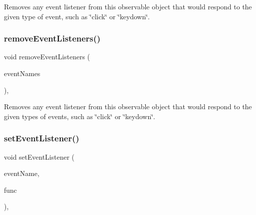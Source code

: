 Removes any event listener from this observable object that would respond to the given type of event, such as \char`\"{}click\char`\"{} or \char`\"{}keydown\char`\"{}. 

\mbox{\label{classsgl_1_1GObservable_af51cc35c29a1bd1908609d432decdbb6}} 
\subsubsection{\texorpdfstring{remove\+Event\+Listeners()}{removeEventListeners()}}
{\footnotesize\ttfamily void remove\+Event\+Listeners (\begin{DoxyParamCaption}\item[{std\+::initializer\+\_\+list$<$ std\+::string $>$}]{event\+Names }\end{DoxyParamCaption})\hspace{0.3cm}{\ttfamily [protected]}, {\ttfamily [virtual]}}



Removes any event listener from this observable object that would respond to the given types of events, such as \char`\"{}click\char`\"{} or \char`\"{}keydown\char`\"{}. 

\mbox{\label{classsgl_1_1GObservable_ad2f6d34961c50f6c1e0659990b79f741}} 
\subsubsection{\texorpdfstring{set\+Event\+Listener()}{setEventListener()}\hspace{0.1cm}{\footnotesize\ttfamily [1/2]}}
{\footnotesize\ttfamily void set\+Event\+Listener (\begin{DoxyParamCaption}\item[{const std\+::string \&}]{event\+Name,  }\item[{\mbox{\hyperlink{namespacesgl_ae9f3e9eab70035da1a2b114e21357b25}{G\+Event\+Listener}}}]{func }\end{DoxyParamCaption})\hspace{0.3cm}{\ttfamily [protected]}, {\ttfamily [virtual]}}



